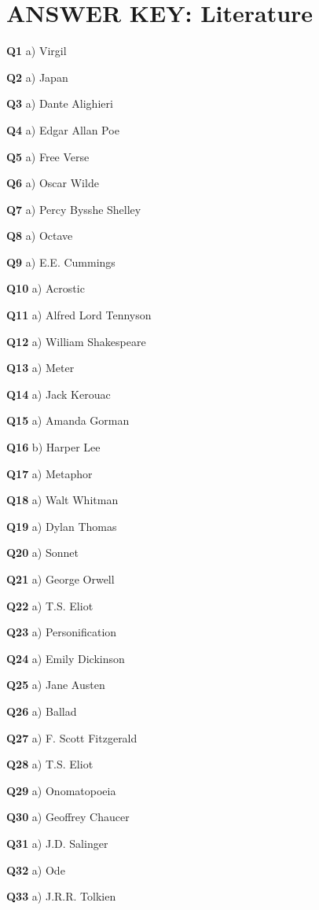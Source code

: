 \section{ANSWER KEY: Literature}

\textbf{Q1} a) Virgil\par
\textbf{Q2} a) Japan\par
\textbf{Q3} a) Dante Alighieri\par
\textbf{Q4} a) Edgar Allan Poe\par
\textbf{Q5} a) Free Verse\par
\textbf{Q6} a) Oscar Wilde\par
\textbf{Q7} a) Percy Bysshe Shelley\par
\textbf{Q8} a) Octave\par
\textbf{Q9} a) E.E. Cummings\par
\textbf{Q10} a) Acrostic\par
\textbf{Q11} a) Alfred Lord Tennyson\par
\textbf{Q12} a) William Shakespeare\par
\textbf{Q13} a) Meter\par
\textbf{Q14} a) Jack Kerouac\par
\textbf{Q15} a) Amanda Gorman\par
\textbf{Q16} b) Harper Lee\par
\textbf{Q17} a) Metaphor\par
\textbf{Q18} a) Walt Whitman\par
\textbf{Q19} a) Dylan Thomas\par
\textbf{Q20} a) Sonnet\par
\textbf{Q21} a) George Orwell\par
\textbf{Q22} a) T.S. Eliot\par
\textbf{Q23} a) Personification\par
\textbf{Q24} a) Emily Dickinson\par
\textbf{Q25} a) Jane Austen\par
\textbf{Q26} a) Ballad\par
\textbf{Q27} a) F. Scott Fitzgerald\par
\textbf{Q28} a) T.S. Eliot\par
\textbf{Q29} a) Onomatopoeia\par
\textbf{Q30} a) Geoffrey Chaucer\par
\textbf{Q31} a) J.D. Salinger\par
\textbf{Q32} a) Ode\par
\textbf{Q33} a) J.R.R. Tolkien\par
